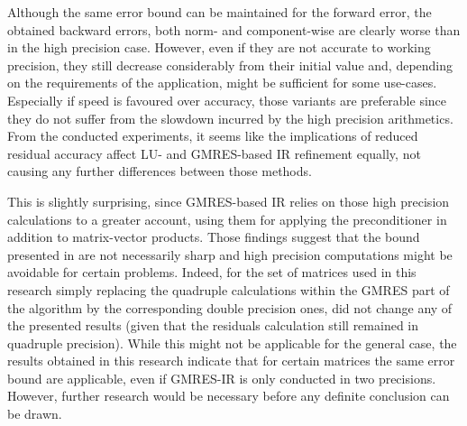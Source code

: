 Although the same error bound can be maintained for the forward error, the obtained backward errors, both norm- and component-wise are clearly worse than in the high precision case. However, even if they are not accurate to working precision, they still decrease considerably from their initial value and, depending on the requirements of the application, might be sufficient for some use-cases. Especially if speed is favoured over accuracy, those variants are preferable since they do not suffer from the slowdown incurred by the high precision arithmetics. From the conducted experiments, it seems like the implications of reduced residual accuracy affect LU- and GMRES-based IR refinement equally, not causing any further differences between those methods.

This is slightly surprising, since GMRES-based IR relies on those high precision calculations to a greater account, using them for applying the preconditioner in addition to matrix-vector products. Those findings suggest that the bound presented in \cite{carson_new_2017} are not necessarily sharp and high precision computations might be avoidable for certain problems. Indeed, for the set of matrices used in this research simply replacing the quadruple calculations within the GMRES part of the algorithm by the corresponding double precision ones, did not change any of the presented results (given that the residuals calculation still remained in quadruple precision). While this might not be applicable for the general case, the results obtained in this research indicate that for certain matrices the same error bound are applicable, even if GMRES-IR is only conducted in two precisions. However, further research would be necessary before any definite conclusion can be drawn. 